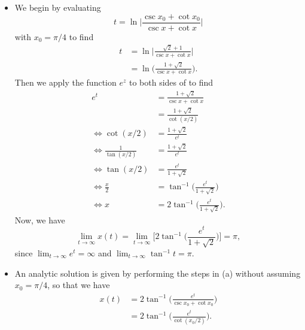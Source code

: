 
\begin{itemize}
  \item[(a)] We begin by evaluating
    \[
      t = \ln{\biggl\lvert\frac{\csc{x_0} + \cot{x_0}}{\csc{x} +
      \cot{x}}\biggr\rvert}
    \]
    with $x_0 = \pi / 4$ to find
    \begin{equation*}
      \begin{split}
        t &= \ln{\biggl\lvert\frac{\sqrt{2} + 1}{\csc{x} +
        \cot{x}}\biggr\rvert} \\
        &= \ln{\biggl(\frac{1 + \sqrt{2}}{\csc{x} + \cot{x}}\biggr)}.
      \end{split}
    \end{equation*}
    Then we apply the function $e^z$ to both sides of to find
    \begin{equation*}
      \begin{split}
        e^t &= \frac{1 + \sqrt{2}}{\csc{x} + \cot{x}} \\
        &= \frac{1 + \sqrt{2}}{\cot{(x/2)}} \\
        \Leftrightarrow \cot{(x/2)} &= \frac{1 + \sqrt{2}}{e^t} \\
        \Leftrightarrow \frac{1}{\tan{(x/2)}} &= \frac{1 + \sqrt{2}}{e^t} \\
        \Leftrightarrow \tan{(x/2)} &= \frac{e^t}{1 + \sqrt{2}} \\
        \Leftrightarrow \frac{x}{2} &= \tan^{-1}{\biggl(\frac{e^t}{1
        + \sqrt{2}}\biggr)} \\
        \Leftrightarrow x &= 2\tan^{-1}{\biggl(\frac{e^t}{1 + \sqrt{2}}\biggr)}.
      \end{split}
    \end{equation*}
    Now, we have
    \[
      \lim_{t \rightarrow \infty} x(t) = \lim_{t \rightarrow \infty}
      \biggl[2\tan^{-1}{\biggl(\frac{e^t}{1 + \sqrt{2}}\biggr)}\biggr] = \pi,
    \]
    since $\lim_{t \rightarrow \infty}e^t = \infty$ and
    $\lim_{t \rightarrow \infty}\tan^{-1}{t} = \pi$.
  \item[(b)] An analytic solution is given by performing the steps in
    (a) without
    assuming $x_0 = \pi / 4$, so that we have
    \begin{equation*}
      \begin{split}
        x(t) &= 2\tan^{-1}{\biggl(\frac{e^t}{\csc{x_0} + \cot{x_0}}\biggr)} \\
        &= 2\tan^{-1}{\biggl(\frac{e^t}{\cot{(x_0/2)}}\biggr)}.
      \end{split}
    \end{equation*}
\end{itemize}
